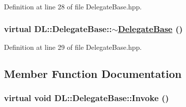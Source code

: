 Definition at line 28 of file Delegate\-Base.hpp.\hypertarget{classDL_1_1DelegateBase_a1}{
\subsubsection[$\sim$DelegateBase]{\setlength{\rightskip}{0pt plus 5cm}virtual DL::Delegate\-Base::$\sim$\hyperlink{classDL_1_1DelegateBase}{Delegate\-Base} ()}}
\label{classDL_1_1DelegateBase_a1}




Definition at line 29 of file Delegate\-Base.hpp.

\subsection{Member Function Documentation}
\hypertarget{classDL_1_1DelegateBase_a2}{
\subsubsection[Invoke]{\setlength{\rightskip}{0pt plus 5cm}virtual void DL::Delegate\-Base::Invoke ()}}
\label{classDL_1_1DelegateBase_a2}




